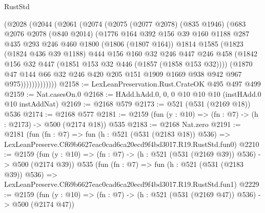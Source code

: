 \begin{lexlean}{RustStd}
\begin{coremodule}
            (@2028
              (@2044
                (@2061
                  (@2074
                    (@2075
                      (@2077 @2078)
                      (@835 @1946)
                      (@683
                        @2076
                        @2078
                        (@840 @2014)
                        (@1776
                          @164
                          @392
                          @156
                          @39
                          @160
                          @1188
                          @287
                          @435
                          @293
                          @246
                          @460
                          @1800
                          (@1806 (@1807 @164))
                          @1814
                          @1585
                          (@1823
                            (@1824 @436 @39 @1188)
                            @444
                            @156
                            @160
                            @32
                            @246
                            @447
                            @246
                            @458
                            (@1842 @156 @32 @447 (@1851 @153 @32 @446 (@1857 (@1858 @153 @32))))
                            (@1870
                              @47
                              @144
                              @66
                              @32
                              @246
                              @420
                              @205
                              @151
                              @1909
                              @1669
                              @938
                              @942
                              @967
                              @975)))))))))))))
@2158 := LexLeanPreservation.Rust.CrateOK @495 @497 @499
@2159 := Nat.casesOn.{0}
@2168 := HAdd.hAdd.{0, 0, 0} @10 @10 @10 (instHAdd.{0} @10 instAddNat)
@2169 := @2168 @579
@2173 := @521 (@531 (@2169 @18)) @536
@2174 := @2168 @577
@2181 := @2159 (fun (y : @10) => (fn : @7) -> (h : @2173) -> @500 (@2174 @18)) @535
@2183 := @2168 Nat.zero
@2191 := @2181
    (fun (fn : @7) =>
    fun (h : @521 (@531 (@2183 @18)) @536) =>
    LexLeanPreserve.Cf69b6627eac0cad6ca20ecd9f4bd3017.R19.RustStd.fun0)
@2210 := @2159
    (fun (y : @10) => (fn : @7) -> (h : @521 (@531 (@2169 @39)) @536) -> @500 (@2174 @39))
    @535
    (fun (fn : @7) =>
    fun (h : @521 (@531 (@2183 @39)) @536) =>
    LexLeanPreserve.Cf69b6627eac0cad6ca20ecd9f4bd3017.R19.RustStd.fun1)
@2229 := @2159
    (fun (y : @10) => (fn : @7) -> (h : @521 (@531 (@2169 @47)) @536) -> @500 (@2174 @47))

\end{coremodule}
\end{lexlean}
